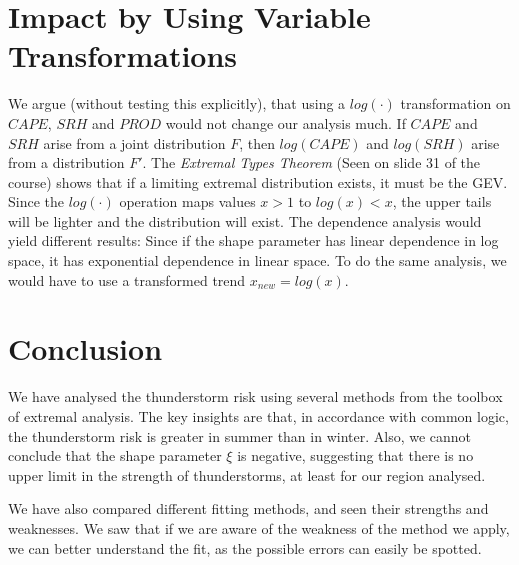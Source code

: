 \documentclass[10pt,conference,compsocconf]{IEEEtran}
\begin{document}
\section*{Impact by Using Variable Transformations}
We argue (without testing this explicitly), that using a $log(\cdot)$ transformation on $CAPE$, $SRH$ and $PROD$ would not change our analysis much. If $CAPE$ and $SRH$ arise from a joint distribution $F$, then $log(CAPE)$ and $log(SRH)$ arise from a distribution $F'$. The \textit{Extremal Types Theorem} (Seen on slide 31 of the course) shows that if a limiting extremal distribution exists, it must be the GEV. Since the $log(\cdot)$ operation maps values $x>1$ to $log(x)<x$, the upper tails will be lighter and the distribution will exist. The dependence analysis would yield different results: Since if the shape parameter has linear dependence in log space, it has exponential dependence in linear space. To do the same analysis, we would have to use a transformed trend $x_{new}= log(x)$. 

\section*{Conclusion}
We have analysed the thunderstorm risk using several methods from the toolbox of extremal analysis. The key insights are that, in accordance with common logic, the thunderstorm risk is greater in summer than in winter. Also, we cannot conclude that the shape parameter $\xi$ is negative, suggesting that there is no upper limit in the strength of thunderstorms, at least for our region analysed.
\par
We have also compared different fitting methods, and seen their strengths and weaknesses. We saw that if we are aware of the weakness of the method we apply, we can better understand the fit, as the possible errors can easily be spotted. 






	
\end{document}
